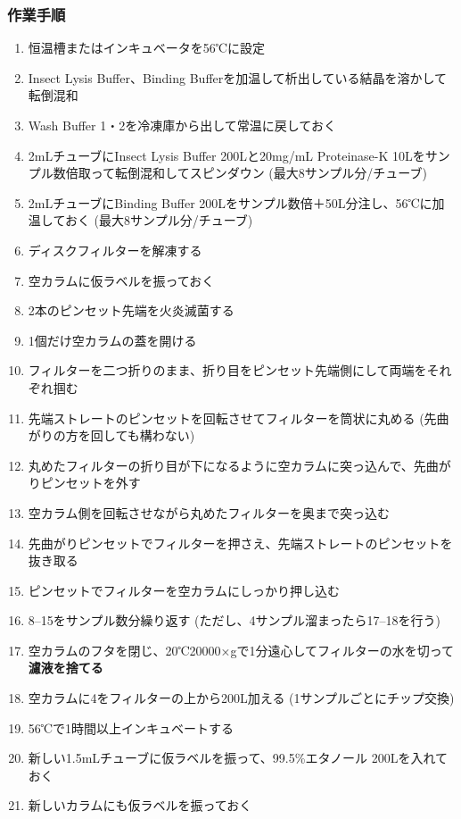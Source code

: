 \documentclass[titlepage,10pt,a4paper,uplatex]{jsbook}
\renewcommand{\textbf}[1]{{\bfseries\sffamily#1}}
\begin{document}
\subsubsection{作業手順}
\begin{enumerate}
\item 恒温槽またはインキュベータを56℃に設定
\item Insect Lysis Buffer、Binding Bufferを加温して析出している結晶を溶かして転倒混和
\item Wash Buffer 1・2を冷凍庫から出して常温に戻しておく
\item 2mLチューブにInsect Lysis Buffer 200{\textmu}Lと20mg/mL Proteinase-K 10{\textmu}Lをサンプル数倍取って転倒混和してスピンダウン (最大8サンプル分/チューブ)
\item 2mLチューブにBinding Buffer 200{\textmu}Lをサンプル数倍＋50{\textmu}L分注し、56℃に加温しておく (最大8サンプル分/チューブ)
\item ディスクフィルターを解凍する
\item 空カラムに仮ラベルを振っておく
\item 2本のピンセット先端を火炎滅菌する
\item 1個だけ空カラムの蓋を開ける
\item フィルターを二つ折りのまま、折り目をピンセット先端側にして両端をそれぞれ掴む
\item 先端ストレートのピンセットを回転させてフィルターを筒状に丸める (先曲がりの方を回しても構わない)
\item 丸めたフィルターの折り目が下になるように空カラムに突っ込んで、先曲がりピンセットを外す
\item 空カラム側を回転させながら丸めたフィルターを奥まで突っ込む
\item 先曲がりピンセットでフィルターを押さえ、先端ストレートのピンセットを抜き取る
\item ピンセットでフィルターを空カラムにしっかり押し込む
\item 8--15をサンプル数分繰り返す (ただし、4サンプル溜まったら17--18を行う)
\item 空カラムのフタを閉じ、20℃20000×gで1分遠心してフィルターの水を切って\textbf{濾液を捨てる}
\item 空カラムに4をフィルターの上から200{\textmu}L加える (1サンプルごとにチップ交換)
\item 56℃で1時間以上インキュベートする
\item 新しい1.5mLチューブに仮ラベルを振って、99.5\%エタノール 200{\textmu}Lを入れておく
\item 新しいカラムにも仮ラベルを振っておく

\end{enumerate}
\end{document}
